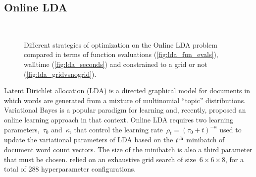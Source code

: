 \documentclass[aos,preprint]{imsart}
\begin{document}
\subsection{Online LDA}
\begin{figure}[ht]
\begin{center}
\\
\end{center}
\caption{Different strategies of optimization on the Online LDA
  problem compared in terms of function evaluations
  (\ref{fig:lda_fun_evals}), walltime (\ref{fig:lda_seconds}) and
  constrained to a grid or not (\ref{fig:lda_gridvsnogrid}).}
\end{figure}

Latent Dirichlet allocation (LDA) is a directed graphical model for
documents in which words are generated from a mixture of multinomial
``topic'' distributions. Variational Bayes is a popular paradigm for
learning and, recently, \citet{Hoffman2010} proposed an online
learning approach in that context. Online LDA requires two learning
parameters,~$\tau_0$ and~$\kappa$, that control the learning
rate~${\rho_t = (\tau_0 + t)^{-\kappa}}$ used to update the
variational parameters of LDA based on the $t^{\rm th}$ minibatch of
document word count vectors. The size of the minibatch is also a third
parameter that must be chosen. \citet{Hoffman2010} relied on an
exhaustive grid search of size~${6\times6\times8}$, for a total of 288
hyperparameter configurations.
\end{document}
